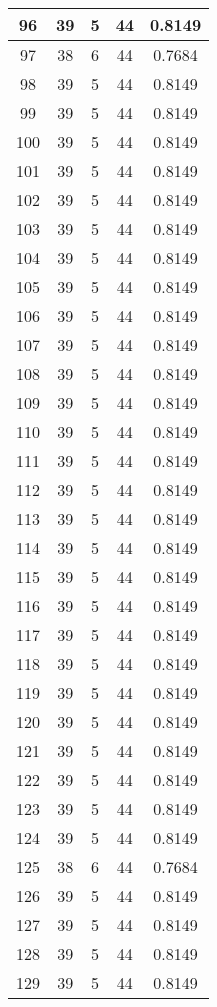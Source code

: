 \documentclass[letterpaper, 12pt]{article}
\begin{document}
\begin{longtable}{|c|c|c|c|c|}
\hline
96 & 39 & 5 & 44 & 0.8149 \\
\hline
97 & 38 & 6 & 44 & 0.7684 \\
\hline
98 & 39 & 5 & 44 & 0.8149 \\
\hline
99 & 39 & 5 & 44 & 0.8149 \\
\hline
100 & 39 & 5 & 44 & 0.8149 \\
\hline
101 & 39 & 5 & 44 & 0.8149 \\
\hline
102 & 39 & 5 & 44 & 0.8149 \\
\hline
103 & 39 & 5 & 44 & 0.8149 \\
\hline
104 & 39 & 5 & 44 & 0.8149 \\
\hline
105 & 39 & 5 & 44 & 0.8149 \\
\hline
106 & 39 & 5 & 44 & 0.8149 \\
\hline
107 & 39 & 5 & 44 & 0.8149 \\
\hline
108 & 39 & 5 & 44 & 0.8149 \\
\hline
109 & 39 & 5 & 44 & 0.8149 \\
\hline
110 & 39 & 5 & 44 & 0.8149 \\
\hline
111 & 39 & 5 & 44 & 0.8149 \\
\hline
112 & 39 & 5 & 44 & 0.8149 \\
\hline
113 & 39 & 5 & 44 & 0.8149 \\
\hline
114 & 39 & 5 & 44 & 0.8149 \\
\hline
115 & 39 & 5 & 44 & 0.8149 \\
\hline
116 & 39 & 5 & 44 & 0.8149 \\
\hline
117 & 39 & 5 & 44 & 0.8149 \\
\hline
118 & 39 & 5 & 44 & 0.8149 \\
\hline
119 & 39 & 5 & 44 & 0.8149 \\
\hline
120 & 39 & 5 & 44 & 0.8149 \\
\hline
121 & 39 & 5 & 44 & 0.8149 \\
\hline
122 & 39 & 5 & 44 & 0.8149 \\
\hline
123 & 39 & 5 & 44 & 0.8149 \\
\hline
124 & 39 & 5 & 44 & 0.8149 \\
\hline
125 & 38 & 6 & 44 & 0.7684 \\
\hline
126 & 39 & 5 & 44 & 0.8149 \\
\hline
127 & 39 & 5 & 44 & 0.8149 \\
\hline
128 & 39 & 5 & 44 & 0.8149 \\
\hline
129 & 39 & 5 & 44 & 0.8149 \\

\end{longtable}
\end{document}
